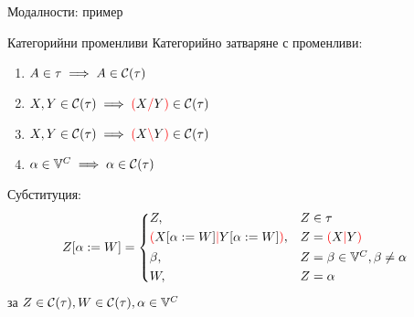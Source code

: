 \documentclass[9pt]{beamer}
\begin{document}
  \begin{frame}{Модалности: пример}

    \begin{center}
      \begin{minipage}{0.5\textwidth}
      \end{minipage}%
    \end{center}
  \end{frame}

  \begin{frame}{Категорийни променливи}
    Категорийно затваряне с променливи:
    \begin{enumerate}
        \item \label{cvar:atomic} $A \in \tau \implies A \in \mathcal{C}( \tau )$
        \item \label{cvar:right}  $X, Y \in \mathcal{C}( \tau ) \implies \textcolor{red}{(} X \textcolor{red}{/} Y \textcolor{red}{)} \in \mathcal{C}( \tau )$
        \item \label{cvar:left}   $X, Y \in \mathcal{C}( \tau ) \implies \textcolor{red}{(} X \textcolor{red}{\backslash} Y \textcolor{red}{)} \in \mathcal{C}( \tau )$
        \item \label{cvar:var}    $\alpha \in \mathbb{V}^{C} \implies \alpha \in \mathcal{C}( \tau )$
    \end{enumerate}
    Субституция:
    \[
        \subst{Z}{\alpha}{W} =
        \begin{cases*}
            Z ,& $Z \in \tau$ \\
            \lp \subst{X}{\alpha}{W} \mc \subst{Y}{\alpha}{W} \rp ,& $Z = \lp X \mc Y \rp$ \\
            \beta ,& $Z = \beta \in \cvars, \beta \neq \alpha$ \\
            W ,& $Z = \alpha$ \\
        \end{cases*}
    \]
    за $Z \in \mathcal{C}( \tau ), W \in \mathcal{C}( \tau ), \alpha \in \mathbb{V}^{C}$
  \end{frame}
\end{document}
